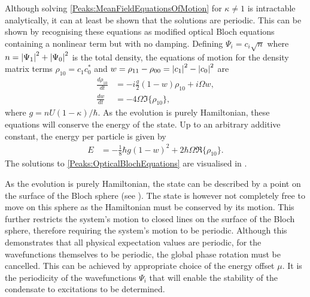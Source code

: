 Although solving \eqref{Peaks:MeanFieldEquationsOfMotion} for $\kappa \neq 1$ is intractable analytically, it can at least be shown that the solutions are periodic. This can be shown by recognising these equations as modified optical Bloch equations containing a nonlinear term but with no damping. Defining $\Psi_i = c_i\sqrt{n}$ where $n = \left|\Psi_1\right|^2 + \left|\Psi_0\right|^2$ is the total density, the equations of motion for the density matrix terms $\rho_{10} = c_{1}^{}c_{0}^*$ and $w = \rho_{11}-\rho_{00} = \left|c_1\right|^2 - \left|c_0\right|^2$ are
\begin{subequations}
    \label{Peaks:OpticalBlochEquations}
    \begin{align}
        \frac{d\rho_{10}}{dt} &= -i\frac{g}{2} (1-w)\rho_{10} + i \Omega w,\\
        \frac{d w}{dt} &= -4 \Omega \Im\{\rho_{10}\},
    \end{align}
\end{subequations}
where $g = n U (1-\kappa)/\hbar$. As the evolution is purely Hamiltonian, these equations will conserve the energy of the state. Up to an arbitrary additive constant, the energy per particle is given by
\begin{align}
    E &= -\frac{1}{8}\hbar g(1 - w)^2 + 2 \hbar \Omega \Re\{\rho_{10}\}.
    \label{Peaks:OpticalBlochEnergy}
\end{align}
The solutions to \eqref{Peaks:OpticalBlochEquations} are visualised in .

As the evolution is purely Hamiltonian, the state can be described by a point on the surface of the Bloch sphere (see ).  The state is however not completely free to move on this sphere as the Hamiltonian must be conserved by its motion. This further restricts the system's motion to closed lines on the surface of the Bloch sphere, therefore requiring the system's motion to be periodic. Although this demonstrates that all physical expectation values are periodic, for the wavefunctions themselves to be periodic, the global phase rotation must be cancelled. This can be achieved by appropriate choice of the energy offset $\mu$. It is the periodicity of the wavefunctions $\Psi_i$ that will enable the stability of the condensate to excitations to be determined.

